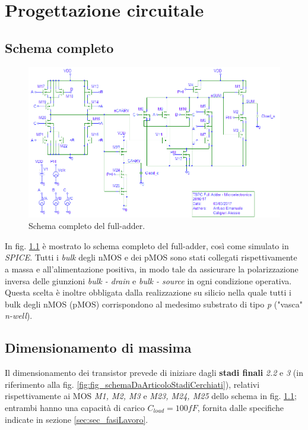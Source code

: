 
\chapter{Progettazione circuitale} %
\label{Chapter3} 

\section{Schema completo}
\begin{figure}[hbt!]
	\centering
	\includegraphics[width=1\textwidth]{figure/TSPC_FA_SchematicScreen.png}
	\caption{Schema completo del full-adder.}
	\label{fig:schemaCircuitale}
	\end{figure}
In fig. \ref{fig:schemaCircuitale} è mostrato lo schema completo del full-adder, così come simulato in \textit{SPICE}. Tutti i \textit{bulk} degli nMOS e dei pMOS sono stati collegati rispettivamente a massa e all'alimentazione positiva, in modo tale da assicurare la polarizzazione inversa delle giunzioni \textit{bulk - drain} e \textit{bulk - source} in ogni condizione operativa. Questa scelta è inoltre obbligata dalla realizzazione su silicio nella quale tutti i bulk degli nMOS (pMOS) corrispondono al medesimo substrato di tipo \textit{p} ("vasca" \textit{n-well}).

\section{Dimensionamento di massima}
\label{sec:sec_dimensionamentoMassima}
Il dimensionamento dei transistor prevede di iniziare dagli \textbf{stadi finali} \textit{2.2} e \textit{3} (in riferimento alla fig. \ref{fig:fig_schemaDaArticoloStadiCerchiati}), relativi rispettivamente ai MOS \textit{M1, M2, M3} e\textit{ M23, M24, M25} dello schema in fig. \ref{fig:schemaCircuitale}; entrambi hanno una capacità di carico $C_{load} = 100fF$, fornita dalle specifiche indicate in sezione \ref{sec:sec_fasiLavoro}.

